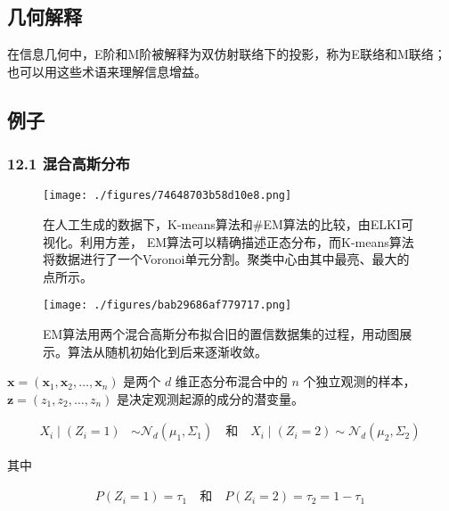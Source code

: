 \subsection{几何解释}

在信息几何中，E阶和M阶被解释为双仿射联络下的投影，称为E联络和M联络；也可以用这些术语来理解信息增益。

\subsection{例子}

\subsubsection{12.1 混合高斯分布}

\begin{figure}[ht]
\centering
\texttt{[image: ./figures/74648703b58d10e8.png]}
\caption{在人工生成的数据下，K-means算法和#EM算法的比较，由ELKI可视化。利用方差， EM算法可以精确描述正态分布，而K-means算法将数据进行了一个Voronoi单元分割。聚类中心由其中最亮、最大的点所示。} \label{fig_ZDQW_2}
\end{figure}

\begin{figure}[ht]
\centering
\texttt{[image: ./figures/bab29686af779717.png]}
\caption{EM算法用两个混合高斯分布拟合旧的置信数据集的过程，用动图展示。算法从随机初始化到后来逐渐收敛。} \label{fig_ZDQW_3}
\end{figure}

$\mathbf{x} = (\mathbf{x}_1, \mathbf{x}_2, \ldots, \mathbf{x}_n)$ 是两个 $d$ 维正态分布混合中的 $n$ 个独立观测的样本，$\mathbf{z} = (z_1, z_2, \ldots, z_n)$ 是决定观测起源的成分的潜变量。

\begin{align}
X_i \mid (Z_i = 1) &\sim \mathcal{N}_d(\mu_1, \Sigma_1) \quad \text{和} \quad X_i \mid (Z_i = 2) \sim \mathcal{N}_d(\mu_2, \Sigma_2)~
\end{align}

其中

\begin{align}
P(Z_i = 1) = \tau_1 \quad \text{和} \quad P(Z_i = 2) = \tau_2 = 1 - \tau_1~
\end{align}

